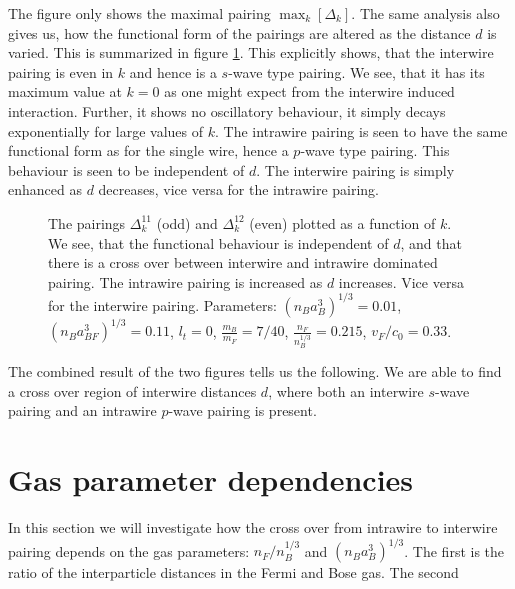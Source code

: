 The figure only shows the maximal pairing $\max_k[\Delta_k]$. The same analysis also gives us, how the functional form of the pairings are altered as the distance $d$ is varied. This is summarized in figure \ref{fig.pairingkdependT0dvaried}. This explicitly shows, that the interwire pairing is even in $k$ and hence is a $s$-wave type pairing. We see, that it has its maximum value at $k=0$ as one might expect from the interwire induced interaction. Further, it shows no oscillatory behaviour, it simply decays exponentially for large values of $k$. The intrawire pairing is seen to have the same functional form as for the single wire, hence a $p$-wave type pairing. This behaviour is seen to be independent of $d$. The interwire pairing is simply enhanced as $d$ decreases, vice versa for the intrawire pairing.  

\begin{figure} 
\begin{center}  
  
\caption{The pairings $\Delta^{11}_k$ (odd) and $\Delta^{12}_k$ (even) plotted as a function of $k$. We see, that the functional behaviour is independent of $d$, and that there is a cross over between interwire and intrawire dominated pairing. The intrawire pairing is increased as $d$ increases. Vice versa for the interwire pairing. Parameters: $(n_Ba_B^3)^{1/3} = 0.01$, $(n_Ba_{BF}^3)^{1/3} = 0.11$, $l_t = 0$, $\frac{m_B}{m_F} = 7/40$, $\frac{n_F}{n_B^{1/3}} = 0.215$, $v_F/c_0 = 0.33$. }  
\label{fig.pairingkdependT0dvaried}  
\end{center}    
\end{figure}

The combined result of the two figures tells us the following. We are able to find a cross over region of interwire distances $d$, where both an interwire $s$-wave pairing and an intrawire $p$-wave pairing is present.

\section{Gas parameter dependencies}
In this section we will investigate how the cross over from intrawire to interwire pairing depends on the gas parameters: $n_F/n_B^{1/3}$ and $(n_Ba_B^3)^{1/3}$. The first is the ratio of the interparticle distances in the Fermi and Bose gas. The second  



